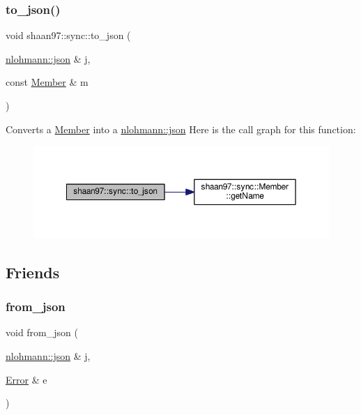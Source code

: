 \subsubsection{\texorpdfstring{to\+\_\+json()}{to\_json()}\hspace{0.1cm}{\footnotesize\ttfamily [2/2]}}
{\footnotesize\ttfamily void shaan97\+::sync\+::to\+\_\+json (\begin{DoxyParamCaption}\item[{\hyperlink{namespacenlohmann_a2bfd99e845a2e5cd90aeaf1b1431f474}{nlohmann\+::json} \&}]{j,  }\item[{const \hyperlink{classshaan97_1_1sync_1_1_member}{Member} \&}]{m }\end{DoxyParamCaption})}

Converts a {\ttfamily \hyperlink{classshaan97_1_1sync_1_1_member}{Member}} into a {\ttfamily \hyperlink{namespacenlohmann_a2bfd99e845a2e5cd90aeaf1b1431f474}{nlohmann\+::json}} Here is the call graph for this function\+:\nopagebreak
\begin{figure}[H]
\begin{center}
\leavevmode
\includegraphics[width=350pt]{group___serialization_gaad90c8bd50725f5382dc2207225f52ee_cgraph}
\end{center}
\end{figure}


\subsection{Friends}
\mbox{\label{group___serialization_ga827d73b9e95e7aa59bf1b159251bedf3}} 
\subsubsection{\texorpdfstring{from\+\_\+json}{from\_json}}
{\footnotesize\ttfamily void from\+\_\+json (\begin{DoxyParamCaption}\item[{\hyperlink{namespacenlohmann_a2bfd99e845a2e5cd90aeaf1b1431f474}{nlohmann\+::json} \&}]{j,  }\item[{\hyperlink{classshaan97_1_1sync_1_1_error}{Error} \&}]{e }\end{DoxyParamCaption})\hspace{0.3cm}{\ttfamily [friend]}}

